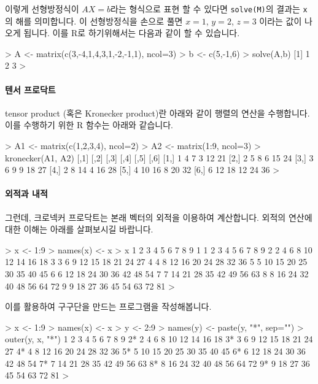 \documentclass[../tutorial.tex]{subfiles}
\begin{document}
이렇게 선형방정식이 $AX=b$라는 형식으로 표현 할 수 있다면 \texttt{solve(M)}의 결과는 \texttt{x}의 해를 의미합니다.
이 선형방정식을 손으로 풀면 $x=1$, $y=2$, $z=3$ 이라는 값이 나오게 됩니다. 
이를 R로 하기위해서는 다음과 같이 할 수 있습니다. 

\begin{Schunk}
\begin{Soutput}
> A <- matrix(c(3,-4,1,4,3,1,-2,-1,1), ncol=3)
> b <- c(5,-1,6)
> solve(A,b)
[1] 1 2 3
> 
\end{Soutput}
\end{Schunk}

\paragraph{텐서 프로닥트}  tensor product (혹은 Kronecker product)란 아래와 같이 행렬의 연산을 수행합니다. 
이를 수행하기 위한 R 함수는 아래와 같습니다. 

\begin{Schunk}
\begin{Soutput}
> A1 <- matrix(c(1,2,3,4), ncol=2)
> A2 <- matrix(1:9, ncol=3)
> kronecker(A1, A2)
     [,1] [,2] [,3] [,4] [,5] [,6]
[1,]    1    4    7    3   12   21
[2,]    2    5    8    6   15   24
[3,]    3    6    9    9   18   27
[4,]    2    8   14    4   16   28
[5,]    4   10   16    8   20   32
[6,]    6   12   18   12   24   36
> 	
\end{Soutput}
\end{Schunk}

\paragraph{외적과 내적}  그런데, 크로넥커 프로닥트는 본래 벡터의 외적을 이용하여 계산합니다. 
외적의 연산에 대한 이해는 아래를 살펴보시길 바랍니다.
\begin{Schunk}
\begin{Soutput}
> x <- 1:9
> names(x) <- x
> x %o% x
  1  2  3  4  5  6  7  8  9
1 1  2  3  4  5  6  7  8  9
2 2  4  6  8 10 12 14 16 18
3 3  6  9 12 15 18 21 24 27
4 4  8 12 16 20 24 28 32 36
5 5 10 15 20 25 30 35 40 45
6 6 12 18 24 30 36 42 48 54
7 7 14 21 28 35 42 49 56 63
8 8 16 24 32 40 48 56 64 72
9 9 18 27 36 45 54 63 72 81
> 
\end{Soutput}
\end{Schunk}

이를 활용하여 구구단을 만드는 프로그램을 작성해봅니다. 

\begin{Schunk}
\begin{Soutput}
> x <- 1:9
> names(x) <- x
> y <- 2:9
> names(y) <- paste(y, "*", sep="")
> outer(y, x, "*")
   1  2  3  4  5  6  7  8  9
2* 2  4  6  8 10 12 14 16 18
3* 3  6  9 12 15 18 21 24 27
4* 4  8 12 16 20 24 28 32 36
5* 5 10 15 20 25 30 35 40 45
6* 6 12 18 24 30 36 42 48 54
7* 7 14 21 28 35 42 49 56 63
8* 8 16 24 32 40 48 56 64 72
9* 9 18 27 36 45 54 63 72 81
> 
\end{Soutput}
\end{Schunk}
\end{document}
